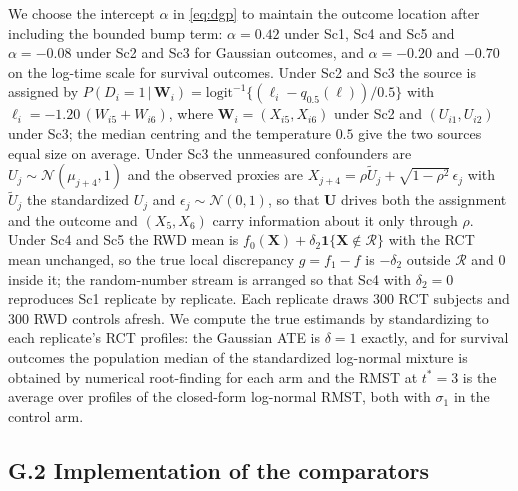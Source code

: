 \documentclass[11pt]{article}
\newcommand{\Normal}{\mathcal{N}}
\newcommand{\logit}{\mathrm{logit}}
\newcommand{\given}{\,\vert\,}
\theoremstyle{definition}
\theoremstyle{plain}
\begin{document}
We choose the intercept $\alpha$ in \eqref{eq:dgp} to maintain the outcome location after including the bounded bump term: $\alpha=0.42$ under Sc1, Sc4 and Sc5 and $\alpha=-0.08$ under Sc2 and Sc3 for Gaussian outcomes, and $\alpha=-0.20$ and $-0.70$ on the log-time scale for survival outcomes. Under Sc2 and Sc3 the source is assigned by $P(D_i=1\given\bm W_i)=\logit^{-1}\{(\ell_i-q_{0.5}(\ell))/0.5\}$ with $\ell_i=-1.20\,(W_{i5}+W_{i6})$, where $\bm W_i=(X_{i5},X_{i6})$ under Sc2 and $(U_{i1},U_{i2})$ under Sc3; the median centring and the temperature $0.5$ give the two sources equal size on average. Under Sc3 the unmeasured confounders are $U_j\sim\Normal(\mu_{j+4},1)$ and the observed proxies are $X_{j+4}=\rho\tilde U_j+\sqrt{1-\rho^2}\,\epsilon_j$ with $\tilde U_j$ the standardized $U_j$ and $\epsilon_j\sim\Normal(0,1)$, so that $\bm U$ drives both the assignment and the outcome and $(X_5,X_6)$ carry information about it only through $\rho$. Under Sc4 and Sc5 the RWD mean is $f_0(\bm X)+\delta_2\mathbf 1\{\bm X\notin\mathcal R\}$ with the RCT mean unchanged, so the true local discrepancy $g=f_1-f$ is $-\delta_2$ outside $\mathcal R$ and $0$ inside it; the random-number stream is arranged so that Sc4 with $\delta_2=0$ reproduces Sc1 replicate by replicate. Each replicate draws $300$ RCT subjects and $300$ RWD controls afresh. We compute the true estimands by standardizing to each replicate's RCT profiles: the Gaussian ATE is $\delta=1$ exactly, and for survival outcomes the population median of the standardized log-normal mixture is obtained by numerical root-finding for each arm and the RMST at $t^\ast=3$ is the average over profiles of the closed-form log-normal RMST, both with $\sigma_1$ in the control arm.

\subsection*{G.2 Implementation of the comparators}
\end{document}
